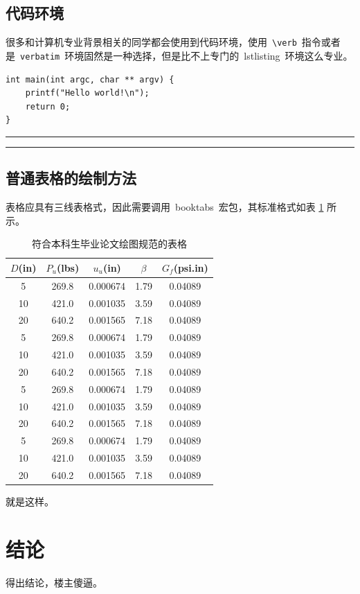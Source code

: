 \section{代码环境}

很多和计算机专业背景相关的同学都会使用到代码环境，使用~\verb|\verb|~指令或者是~\verb|verbatim|~环境固然是一种选择，但是比不上专门的~lstlisting~环境这么专业。

\begin{lstlisting}
int main(int argc, char ** argv) {
    printf("Hello world!\n");
    return 0;
}
\end{lstlisting}

\noindent\hrule
\vspace{0.1em}\noindent\hrule

\vspace{1em}

\section{普通表格的绘制方法}

表格应具有三线表格式，因此需要调用~booktabs~宏包，其标准格式如表 \ref{tab:table1} 所示。
\begin{table}[htbp]
\caption{符合本科生毕业论文绘图规范的表格}\label{tab:table1}
\vspace{0.5em}\centering\wuhao
\begin{tabular}{ccccc}
\toprule[1.5pt]
$D$(in) & $P_u$(lbs) & $u_u$(in) & $\beta$ & $G_f$(psi.in)\\
\midrule[1pt]
 5 & 269.8 & 0.000674 & 1.79 & 0.04089\\
10 & 421.0 & 0.001035 & 3.59 & 0.04089\\
20 & 640.2 & 0.001565 & 7.18 & 0.04089\\
 5 & 269.8 & 0.000674 & 1.79 & 0.04089\\
10 & 421.0 & 0.001035 & 3.59 & 0.04089\\
20 & 640.2 & 0.001565 & 7.18 & 0.04089\\
 5 & 269.8 & 0.000674 & 1.79 & 0.04089\\
10 & 421.0 & 0.001035 & 3.59 & 0.04089\\
20 & 640.2 & 0.001565 & 7.18 & 0.04089\\
 5 & 269.8 & 0.000674 & 1.79 & 0.04089\\
10 & 421.0 & 0.001035 & 3.59 & 0.04089\\
20 & 640.2 & 0.001565 & 7.18 & 0.04089\\
\bottomrule[1.5pt]
\end{tabular}
\vspace{\baselineskip}
\end{table}

就是这样。



\chapter*{结\quad 论}

得出结论，楼主傻逼。